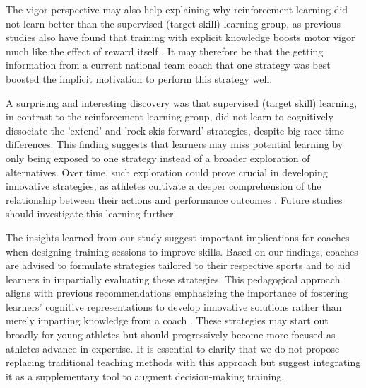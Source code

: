 \documentclass[pdflatex,sn-mathphys-num]{sn-jnl}%
\theoremstyle{thmstyleone}%
\theoremstyle{thmstyletwo}%
\theoremstyle{thmstylethree}%
\begin{document}
The vigor perspective may also help explaining why reinforcement learning did not learn better than the supervised (target skill) learning group, as previous studies also have found that training with explicit knowledge boosts motor vigor much like the effect of reward itself \cite{anderson_rewards_2020, wong_explicit_2015}. It may therefore be that the getting information from a current national team coach that one strategy was best boosted the implicit motivation to perform this strategy well. 

A surprising and interesting discovery was that supervised (target skill) learning, in contrast to the reinforcement learning group, did not learn to cognitively dissociate the 'extend' and 'rock skis forward' strategies, despite big race time differences. This finding suggests that learners may miss potential learning by only being exposed to one strategy instead of a broader exploration of alternatives. Over time, such exploration could prove crucial in developing innovative strategies, as athletes cultivate a deeper comprehension of the relationship between their actions and performance outcomes \cite{ericsson_scientific_1998}. Future studies should investigate this learning further. 

The insights learned from our study suggest important implications for coaches when designing training sessions to improve skills. Based on our findings, coaches are advised to formulate strategies tailored to their respective sports and to aid learners in impartially evaluating these strategies. This pedagogical approach aligns with previous recommendations emphasizing the importance of fostering learners' cognitive representations to develop innovative solutions rather than merely imparting knowledge from a coach \cite{ericsson_scientific_1998}. These strategies may start out broadly for young athletes but should progressively become more focused as athletes advance in expertise. It is essential to clarify that we do not propose replacing traditional teaching methods with this approach but suggest integrating it as a supplementary tool to augment decision-making training.
\end{document}
